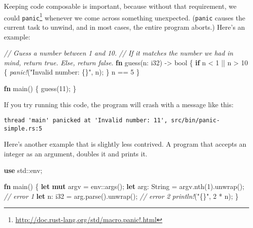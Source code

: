\documentclass[a4paper,]{book}
\renewcommand*{\hypertarget}[3][\ar]{%
  \def\ar{#2}%
  \label{#1}%
  #3}
\newenvironment{Shaded}{\begin{snugshade}}{\end{snugshade}}
\newcommand{\KeywordTok}[1]{\textcolor[rgb]{0.13,0.29,0.53}{\textbf{{#1}}}}
\newcommand{\DataTypeTok}[1]{\textcolor[rgb]{0.13,0.29,0.53}{{#1}}}
\newcommand{\DecValTok}[1]{\textcolor[rgb]{0.00,0.00,0.81}{{#1}}}
\newcommand{\StringTok}[1]{\textcolor[rgb]{0.31,0.60,0.02}{{#1}}}
\newcommand{\CommentTok}[1]{\textcolor[rgb]{0.56,0.35,0.01}{\textit{{#1}}}}
\newcommand{\PreprocessorTok}[1]{\textcolor[rgb]{0.56,0.35,0.01}{\textit{{#1}}}}
\newcommand{\NormalTok}[1]{{#1}}
\renewcommand{\href}[2]{#2\footnote{\url{#1}}}
\begin{document}
Keeping code composable is important, because without that requirement,
we could
\href{http://doc.rust-lang.org/std/macro.panic!.html}{\texttt{panic}}
whenever we come across something unexpected. (\texttt{panic} causes the
current task to unwind, and in most cases, the entire program aborts.)
Here's an example:

\begin{Shaded}
\begin{Highlighting}[]
\CommentTok{// Guess a number between 1 and 10.}
\CommentTok{// If it matches the number we had in mind, return true. Else, return false.}
\KeywordTok{fn} \NormalTok{guess(n: }\DataTypeTok{i32}\NormalTok{) -> }\DataTypeTok{bool} \NormalTok{\{}
    \KeywordTok{if} \NormalTok{n < }\DecValTok{1} \NormalTok{|| n > }\DecValTok{10} \NormalTok{\{}
        \PreprocessorTok{panic!}\NormalTok{(}\StringTok{"Invalid number: \{\}"}\NormalTok{, n);}
    \NormalTok{\}}
    \NormalTok{n == }\DecValTok{5}
\NormalTok{\}}

\KeywordTok{fn} \NormalTok{main() \{}
    \NormalTok{guess(}\DecValTok{11}\NormalTok{);}
\NormalTok{\}}
\end{Highlighting}
\end{Shaded}

If you try running this code, the program will crash with a message like
this:

\begin{verbatim}
thread 'main' panicked at 'Invalid number: 11', src/bin/panic-simple.rs:5
\end{verbatim}

Here's another example that is slightly less contrived. A program that
accepts an integer as an argument, doubles it and prints it.

\protect\hypertarget{code-unwrap-double}{}{}

\begin{Shaded}
\begin{Highlighting}[]
\KeywordTok{use} \NormalTok{std::env;}

\KeywordTok{fn} \NormalTok{main() \{}
    \KeywordTok{let} \KeywordTok{mut} \NormalTok{argv = env::args();}
    \KeywordTok{let} \NormalTok{arg: }\DataTypeTok{String} \NormalTok{= argv.nth(}\DecValTok{1}\NormalTok{).unwrap(); }\CommentTok{// error 1}
    \KeywordTok{let} \NormalTok{n: }\DataTypeTok{i32} \NormalTok{= arg.parse().unwrap(); }\CommentTok{// error 2}
    \PreprocessorTok{println!}\NormalTok{(}\StringTok{"\{\}"}\NormalTok{, }\DecValTok{2} \NormalTok{* n);}
\NormalTok{\}}
\end{Highlighting}
\end{Shaded}
\end{document}

